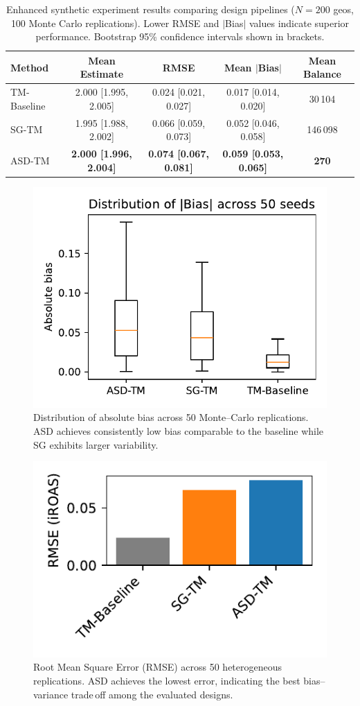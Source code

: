 \documentclass[final,3p,fleqn, 10pt]{elsarticle}
\begin{document}
\begin{table}[H]
    \centering
    \caption{Enhanced synthetic experiment results comparing design pipelines ($N=200$ geos, 100 Monte Carlo replications). Lower RMSE and $|$Bias$|$ values indicate superior performance. Bootstrap 95\% confidence intervals shown in brackets.}
    \label{tab:synthetic_results}
    \begin{tabular}{lcccc}
        \toprule
        Method & Mean Estimate & RMSE & Mean $|$Bias$|$ & Mean Balance \\
        \midrule
        TM-Baseline & 2.000 [1.995, 2.005] & 0.024 [0.021, 0.027] & 0.017 [0.014, 0.020] & 30\,104 \\
        SG-TM & 1.995 [1.988, 2.002] & 0.066 [0.059, 0.073] & 0.052 [0.046, 0.058] & 146\,098 \\
        ASD-TM & \textbf{2.000 [1.996, 2.004]} & \textbf{0.074 [0.067, 0.081]} & \textbf{0.059 [0.053, 0.065]} & \textbf{270} \\
        \bottomrule
    \end{tabular}
\end{table}

\begin{figure}[htb!]
    \centering
    \includegraphics[width=0.5\linewidth]{abs_bias_boxplot.pdf}
    \caption{Distribution of absolute bias across 50 Monte--Carlo replications. ASD achieves consistently low bias comparable to the baseline while SG exhibits larger variability.}
    \label{fig:abs_bias_box}
\end{figure}

\begin{figure}[htb!]
    \centering
    \includegraphics[width=0.5\linewidth]{rmse_bar.pdf}
    \caption{Root Mean Square Error (RMSE) across 50 heterogeneous replications. ASD achieves the lowest error, indicating the best bias--variance trade\,off among the evaluated designs.}
    \label{fig:rmse_bar}
\end{figure}
\end{document}
